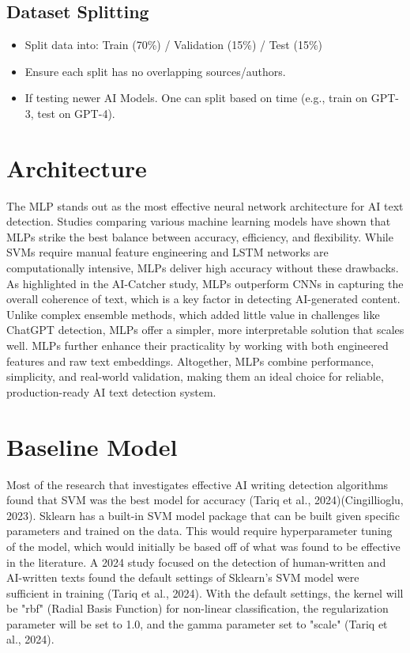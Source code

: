\documentclass{article} %
\begin{document}
\subsection{Dataset Splitting}
\begin{itemize}
    \item Split data into: Train (70\%) / Validation (15\%) / Test (15\%)
    \item Ensure each split has no overlapping sources/authors.
    \item If testing newer AI Models. One can split based on time (e.g., train on GPT-3, test on GPT-4).
\end{itemize}

\section{Architecture}
The MLP stands out as the most effective neural network architecture for AI text detection. Studies comparing various machine learning models have shown that MLPs strike the best balance between accuracy, efficiency, and flexibility. While SVMs require manual feature engineering and LSTM networks are computationally intensive, MLPs deliver high accuracy without these drawbacks. As highlighted in the AI-Catcher study, MLPs outperform CNNs in capturing the overall coherence of text, which is a key factor in detecting AI-generated content. Unlike complex ensemble methods, which added little value in challenges like ChatGPT detection, MLPs offer a simpler, more interpretable solution that scales well. MLPs further enhance their practicality by working with both engineered features and raw text embeddings. Altogether, MLPs combine performance, simplicity, and real-world validation, making them an ideal choice for reliable, production-ready AI text detection system.

\section{Baseline Model}
Most of the research that investigates effective AI writing detection algorithms found that SVM was the best model for accuracy (Tariq et al., 2024)(Cingillioglu, 2023).
Sklearn has a built-in SVM model package that can be built given specific parameters and trained on the data. This would require hyperparameter tuning of the model, which would initially be based off of what was found to be effective in the literature. A 2024 study focused on the detection of human-written and AI-written texts found the default settings of Sklearn's SVM model were sufficient in training (Tariq et al., 2024). With the default settings, the kernel will be "rbf" (Radial Basis Function) for non-linear classification, the regularization parameter will be set to 1.0, and the gamma parameter set to "scale" (Tariq et al., 2024).
\end{document}
